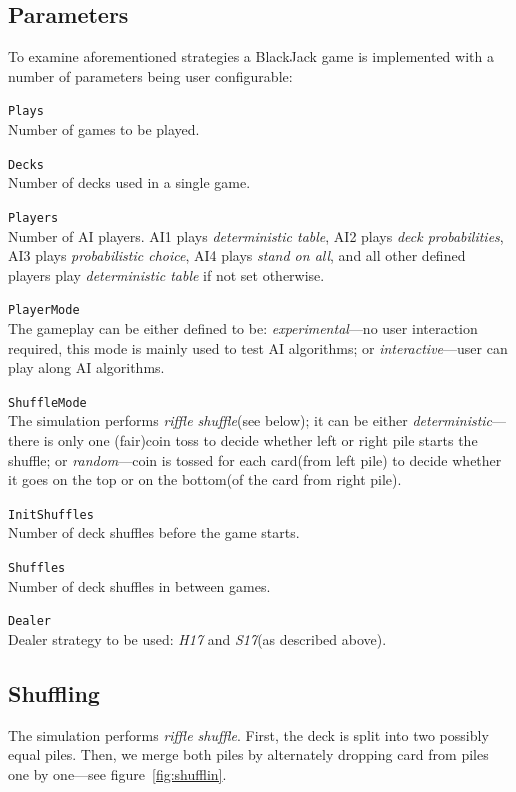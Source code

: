 \documentclass[12pt,a4paper,twocolumn]{article}
\begin{document}
\subsection*{Parameters}
To examine aforementioned strategies a BlackJack game is implemented with a number of parameters being user configurable:
\begin{description}
\item{\texttt{Plays}} \hfill\\
Number of games to be played.
\item{\texttt{Decks}} \hfill\\
Number of decks used in a single game.
\item{\texttt{Players}} \hfill\\
Number of AI players. AI1 plays \emph{deterministic table}, AI2 plays \emph{deck probabilities}, AI3 plays \emph{probabilistic choice}, AI4 plays \emph{stand on all}, and all other defined players play \emph{deterministic table} if not set otherwise.
\item{\texttt{PlayerMode}} \hfill\\
The gameplay can be either defined to be: \emph{experimental}---no user interaction required, this mode is mainly used to test AI algorithms; or \emph{interactive}---user can play along AI algorithms.
\item{\texttt{ShuffleMode}} \hfill\\
The simulation performs \emph{riffle shuffle}(see below); it can be either \emph{deterministic}---there is only one (fair)coin toss to decide whether left or right pile starts the shuffle; or \emph{random}---coin is tossed for each card(from left pile) to decide whether it goes on the top or on the bottom(of the card from right pile).
\item{\texttt{InitShuffles}} \hfill\\
Number of deck shuffles before the game starts.
\item{\texttt{Shuffles}} \hfill\\
Number of deck shuffles in between games.
\item{\texttt{Dealer}} \hfill\\
Dealer strategy to be used: \emph{H17} and \emph{S17}(as described above).
\end{description}

\subsection*{Shuffling}
The simulation performs \emph{riffle shuffle}. First, the deck is split into two possibly equal piles. Then, we merge both piles by alternately dropping card from piles one by one---see figure~\ref{fig:shufflin}.\\
\end{document}
